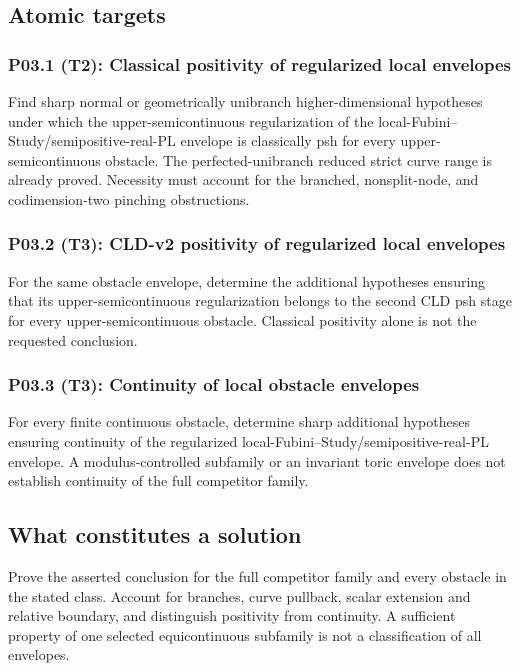 \documentclass[11pt,a4paper]{article}
\theoremstyle{definition}
\theoremstyle{remark}
\begin{document}
\subsection{Atomic targets}
\subsubsection*{P03.1 (T2): Classical positivity of regularized local envelopes}
\label{atom:P03.1}
Find sharp normal or geometrically unibranch higher-dimensional hypotheses under which the upper-semicontinuous regularization of the local-Fubini--Study/semipositive-real-PL envelope is classically psh for every upper-semicontinuous obstacle. The perfected-unibranch reduced strict curve range is already proved. Necessity must account for the branched, nonsplit-node, and codimension-two pinching obstructions.

\subsubsection*{P03.2 (T3): CLD-v2 positivity of regularized local envelopes}
\label{atom:P03.2}
For the same obstacle envelope, determine the additional hypotheses ensuring that its upper-semicontinuous regularization belongs to the second CLD psh stage for every upper-semicontinuous obstacle. Classical positivity alone is not the requested conclusion.

\subsubsection*{P03.3 (T3): Continuity of local obstacle envelopes}
\label{atom:P03.3}
For every finite continuous obstacle, determine sharp additional hypotheses ensuring continuity of the regularized local-Fubini--Study/semipositive-real-PL envelope. A modulus-controlled subfamily or an invariant toric envelope does not establish continuity of the full competitor family.

\subsection{What constitutes a solution}
Prove the asserted conclusion for the full competitor family and every obstacle in the stated class. Account for branches, curve pullback, scalar extension and relative boundary, and distinguish positivity from continuity. A sufficient property of one selected equicontinuous subfamily is not a classification of all envelopes.
\end{document}

